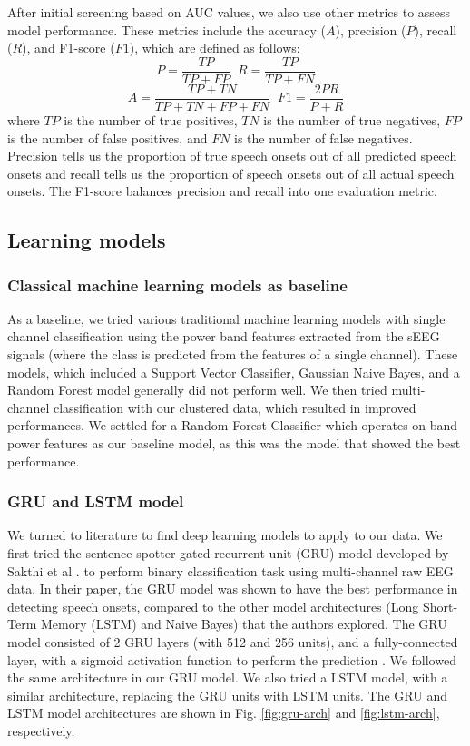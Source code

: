 \documentclass[format=sigconf, nonacm=true, review=true, screen=true]{acmart}
\begin{document}
After initial screening based on AUC values, we also use other metrics to assess model performance. These metrics include the accuracy ($A$), precision ($P$), recall ($R$), and F1-score ($F1$), which are defined as follows:
\[P=\frac{TP}{TP+FP} \;\; R=\frac{TP}{TP+FN}\]
\[A=\frac{TP+TN}{TP+TN+FP+FN} \;\; F1=\frac{2PR}{P+R}\]
where $TP$ is the number of true positives, $TN$ is the number of true negatives, $FP$ is the number of false positives, and $FN$ is the number of false negatives. Precision tells us the proportion of true speech onsets out of all predicted speech onsets and recall tells us the proportion of speech onsets out of all actual speech onsets. The F1-score balances precision and recall into one evaluation metric.

\subsection{Learning models}

\subsubsection{Classical machine learning models as baseline}
As a baseline, we tried various traditional machine learning models with single channel classification using the power band features extracted from the sEEG signals (where the class is predicted from the features of a single channel). These models, which included a Support Vector Classifier, Gaussian Naive Bayes, and a Random Forest model generally did not perform well. We then tried multi-channel classification with our clustered data, which resulted in improved performances. We settled for a Random Forest Classifier which operates on band power features as our baseline model, as this was the model that showed the best performance.

\subsubsection{GRU and LSTM model}
We turned to literature to find deep learning models to apply to our data. We first tried the sentence spotter gated-recurrent unit (GRU) model developed by Sakthi et al \cite{sakthi2021keyword}. to perform binary classification task using multi-channel raw EEG data. In their paper, the GRU model was shown to have the best performance in detecting speech onsets, compared to the other model architectures (Long Short-Term Memory (LSTM) and Naive Bayes) that the authors explored. \cite{sakthi2021keyword} The GRU model consisted of 2 GRU layers (with 512 and 256 units), and a fully-connected layer, with a sigmoid activation function to perform the prediction \cite{sakthi2021keyword}. We followed the same architecture in our GRU model. We also tried a LSTM model, with a similar architecture, replacing the GRU units with LSTM units. The GRU and LSTM model architectures are shown in Fig. \ref{fig:gru-arch} and \ref{fig:lstm-arch}, respectively.
\end{document}
